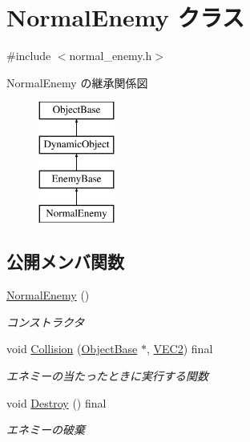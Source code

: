 \hypertarget{class_normal_enemy}{}\section{Normal\+Enemy クラス}
\label{class_normal_enemy}


{\ttfamily \#include $<$normal\+\_\+enemy.\+h$>$}

Normal\+Enemy の継承関係図\begin{figure}[H]
\begin{center}
\leavevmode
\includegraphics[height=4.000000cm]{class_normal_enemy}
\end{center}
\end{figure}
\subsection*{公開メンバ関数}
\begin{DoxyCompactItemize}
\item 
\mbox{\hyperlink{class_normal_enemy_aa386eea59a2983574fe7d55a91f93012}{Normal\+Enemy}} ()
\begin{DoxyCompactList}\small\item\em コンストラクタ \end{DoxyCompactList}\item 
void \mbox{\hyperlink{class_normal_enemy_ac27e00973d2430da57e044bfe04fe5b4}{Collision}} (\mbox{\hyperlink{class_object_base}{Object\+Base}} $\ast$, \mbox{\hyperlink{transform_8h_afb0c5e21d4133ff4f200992c0b534e1b}{V\+E\+C2}}) final
\begin{DoxyCompactList}\small\item\em エネミーの当たったときに実行する関数 \end{DoxyCompactList}\item 
void \mbox{\hyperlink{class_normal_enemy_a8a4271b6da6c7679d134d1c08125815b}{Destroy}} () final
\begin{DoxyCompactList}\small\item\em エネミーの破棄 \end{DoxyCompactList}\end{DoxyCompactItemize}
